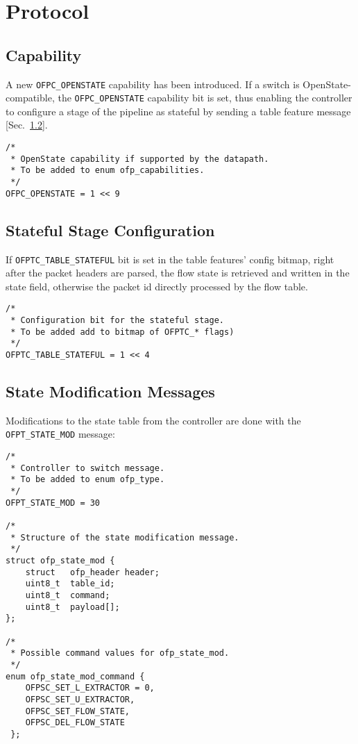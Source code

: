 
\chapter{Protocol}
\label{chap:protocol}

\section{Capability}
\label{sec:capability}

A new \texttt{OFPC\_OPENSTATE} capability has been introduced. If a switch is OpenState-compatible, the \texttt{OFPC\_OPENSTATE} capability bit is set, thus enabling the controller to configure a stage of the pipeline as stateful by sending a table feature message [Sec.~\ref{sec:table_conf}].

\begin{verbatim}
/*
 * OpenState capability if supported by the datapath.
 * To be added to enum ofp_capabilities.
 */
OFPC_OPENSTATE = 1 << 9 
\end{verbatim}

\section{Stateful Stage Configuration}
\label{sec:table_conf}

If \texttt{OFPTC\_TABLE\_STATEFUL} bit is set in the table features' config bitmap, right after the packet headers are parsed, the flow state is retrieved and written in the state field, otherwise the packet id directly processed by the flow table. 

\begin{verbatim}
/*
 * Configuration bit for the stateful stage.
 * To be added add to bitmap of OFPTC_* flags)
 */ 
OFPTC_TABLE_STATEFUL = 1 << 4 
\end{verbatim}

\section{State Modification Messages}

\label{sec:msg_set_state_proto}

Modifications to the state table from the controller are done with the \texttt{OFPT\_STATE\_MOD} message:

\begin{verbatim}
/*
 * Controller to switch message.
 * To be added to enum ofp_type.
 */
OFPT_STATE_MOD = 30

/*
 * Structure of the state modification message.
 */
struct ofp_state_mod {
    struct   ofp_header header;
    uint8_t  table_id;
    uint8_t  command;
    uint8_t  payload[];
};

/*
 * Possible command values for ofp_state_mod.
 */
enum ofp_state_mod_command {
    OFPSC_SET_L_EXTRACTOR = 0,
    OFPSC_SET_U_EXTRACTOR,
    OFPSC_SET_FLOW_STATE,   
    OFPSC_DEL_FLOW_STATE
 };
\end{verbatim}


